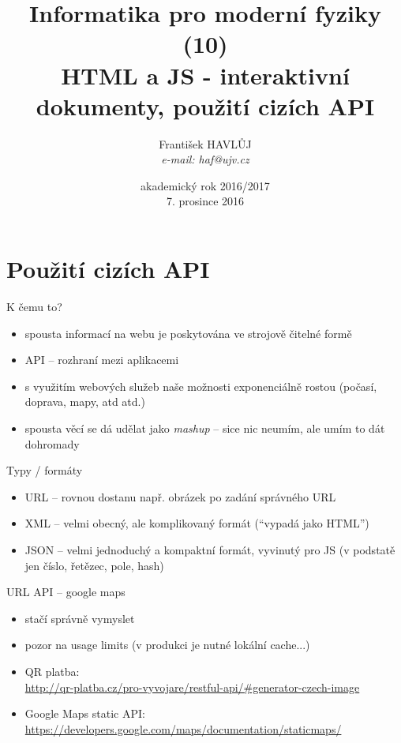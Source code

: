 \documentclass{beamer}
\title[IMF (10)]{Informatika pro moderní fyziky (10)\\ HTML a JS - interaktivní dokumenty, použití cizích API}
\author[Franti\v{s}ek HAVL\r{U}J, ORF ÚJV Řež]{Franti\v{s}ek HAVL\r{U}J\\{\scriptsize \emph{e-mail: haf@ujv.cz}}}
\date{akademický rok 2016/2017\\7. prosince 2016}
\institute[ORF ÚJV Řež]
{ÚJV Řež\\oddělení Reaktorové fyziky a podpory palivového cyklu}
\begin{document}
\begin{frame}
  \titlepage
\end{frame}

\begin{frame}
  \tableofcontents
\end{frame}

\section{Použití cizích API}

\begin{frame}{K čemu to?}
  \begin{itemize}
    \item spousta informací na webu je poskytována ve strojově čitelné formě
    \item API -- rozhraní mezi aplikacemi
    \item s využitím webových služeb naše možnosti exponenciálně rostou (počasí, doprava, mapy, atd atd.)
    \item spousta věcí se dá udělat jako \emph{mashup} -- sice nic neumím, ale umím to dát dohromady
  \end{itemize}
\end{frame}


\begin{frame}{Typy / formáty}
  \begin{itemize}
    \item URL -- rovnou dostanu např. obrázek po zadání správného URL
    \item XML -- velmi obecný, ale komplikovaný formát (``vypadá jako HTML'')
    \item JSON -- velmi jednoduchý a kompaktní formát, vyvinutý pro JS (v podstatě jen číslo, řetězec, pole, hash)
  \end{itemize}
\end{frame}


\begin{frame}{URL API -- google maps}
  \begin{itemize}
    \item stačí správně vymyslet
    \item pozor na usage limits (v produkci je nutné lokální cache...)
    \item QR platba: \\
    {\tiny \url{http://qr-platba.cz/pro-vyvojare/restful-api/\#generator-czech-image}}
    \item Google Maps static API: \\
    {\tiny \url{https://developers.google.com/maps/documentation/staticmaps/}}
  \end{itemize}
\end{frame}
\end{document}
